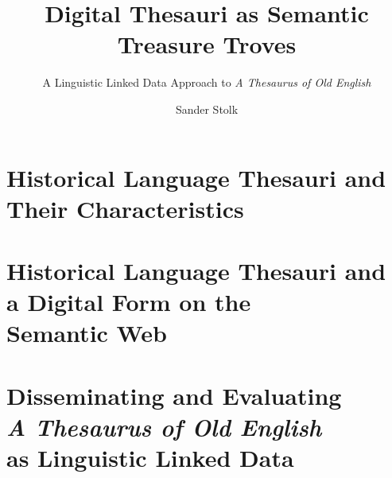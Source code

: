 \documentclass[twoside,table,11pt,numbers=endperiod]{scrbook}
\title{Digital Thesauri as Semantic Treasure Troves}
\subtitle{A Linguistic Linked Data Approach to \emph{A Thesaurus of Old English}}
\author{Sander Stolk}
\begin{document}
\frontmatter \setcounter{chapter}{-1} 







\tableofcontents

\mainmatter




\part[Historical Language Thesauri and Their Characteristics]{Historical Language Thesauri and\\Their Characteristics}








\part[Historical Language Thesauri and a Digital Form on the Semantic Web]{Historical Language Thesauri and\\a Digital Form on the\\Semantic Web}




 




\part[Disseminating and Evaluating \textit{A Thesaurus of Old English} as Linguistic Linked Data]{Disseminating and Evaluating\\\textit{A Thesaurus of Old English}\\as Linguistic Linked Data}
\end{document}
